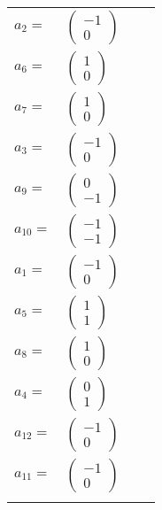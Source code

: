 \documentclass[1p]{elsarticle_modified}
\theoremstyle{definition}
\begin{document}
\begin{tabular}{m{7pt} m{180pt} m{7pt} m{180pt} }
\flushright $a_{2}=$&$\begin{pmatrix}-1\\0\end{pmatrix}$ \\
\flushright $a_{6}=$&$\begin{pmatrix}1\\0\end{pmatrix}$ \\
\flushright $a_{7}=$&$\begin{pmatrix}1\\0\end{pmatrix}$ \\
\flushright $a_{3}=$&$\begin{pmatrix}-1\\0\end{pmatrix}$ \\
\flushright $a_{9}=$&$\begin{pmatrix}0\\-1\end{pmatrix}$ \\
\flushright $a_{10}=$&$\begin{pmatrix}-1\\-1\end{pmatrix}$ \\
\flushright $a_{1}=$&$\begin{pmatrix}-1\\0\end{pmatrix}$ \\
\flushright $a_{5}=$&$\begin{pmatrix}1\\1\end{pmatrix}$ \\
\flushright $a_{8}=$&$\begin{pmatrix}1\\0\end{pmatrix}$ \\
\flushright $a_{4}=$&$\begin{pmatrix}0\\1\end{pmatrix}$ \\
\flushright $a_{12}=$&$\begin{pmatrix}-1\\0\end{pmatrix}$ \\
\flushright $a_{11}=$&$\begin{pmatrix}-1\\0\end{pmatrix}$\\&\end{tabular}
\end{document}
